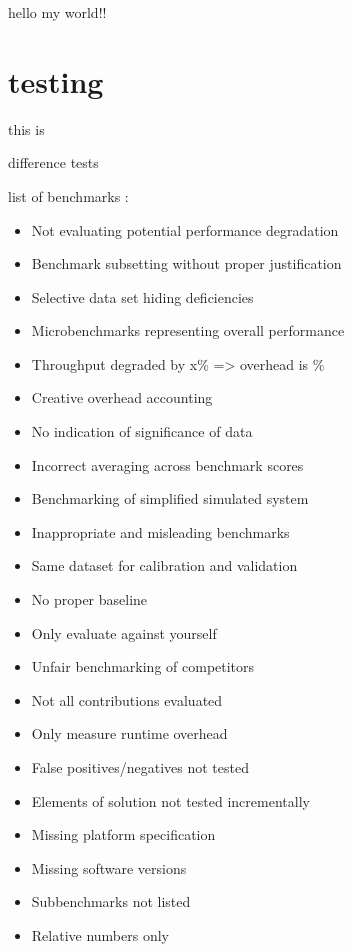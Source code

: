 
hello my world!!

\section{testing}

this is \cite{arcuri_practical_2011}

difference tests  \cite{sonnenwald2003evaluating}
\cite{lilja2005measuring}
\cite{bukh1992art}

list of benchmarks \cite{van_der_kouwe_benchmarking_2018}:
\begin{itemize}
    \item  Not evaluating potential performance degradation
    \item  Benchmark subsetting without proper justification
    \item  Selective data set hiding deficiencies
    \item  Microbenchmarks representing overall performance
    \item  Throughput degraded by x\% => overhead is \%
    \item  Creative overhead accounting
    \item  No indication of significance of data
    \item  Incorrect averaging across benchmark scores
    \item  Benchmarking of simplified simulated system
    \item  Inappropriate and misleading benchmarks
    \item  Same dataset for calibration and validation
    \item  No proper baseline
    \item  Only evaluate against yourself
    \item  Unfair benchmarking of competitors
    \item  Not all contributions evaluated
    \item  Only measure runtime overhead
    \item  False positives/negatives not tested
    \item  Elements of solution not tested incrementally
    \item  Missing platform specification
    \item  Missing software versions
    \item  Subbenchmarks not listed
    \item  Relative numbers only
\end{itemize}
\cite{mytkowicz2009producing}

